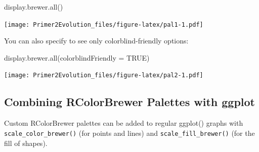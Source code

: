 \documentclass[
]{book}
\newenvironment{Shaded}{\begin{snugshade}}{\end{snugshade}}
\newcommand{\AttributeTok}[1]{\textcolor[rgb]{0.77,0.63,0.00}{#1}}
\newcommand{\ConstantTok}[1]{\textcolor[rgb]{0.00,0.00,0.00}{#1}}
\newcommand{\FunctionTok}[1]{\textcolor[rgb]{0.00,0.00,0.00}{#1}}
\newcommand{\NormalTok}[1]{#1}
\begin{document}
\begin{Shaded}
\begin{Highlighting}[]
\FunctionTok{display.brewer.all}\NormalTok{()}
\end{Highlighting}
\end{Shaded}

\texttt{[image: Primer2Evolution\_files/figure-latex/pal1-1.pdf]}

You can also specify to see only colorblind-friendly options:

\begin{Shaded}
\begin{Highlighting}[]
\FunctionTok{display.brewer.all}\NormalTok{(}\AttributeTok{colorblindFriendly =} \ConstantTok{TRUE}\NormalTok{)}
\end{Highlighting}
\end{Shaded}

\texttt{[image: Primer2Evolution\_files/figure-latex/pal2-1.pdf]}

\hypertarget{combining-rcolorbrewer-palettes-with-ggplot}{%
\subsection{Combining RColorBrewer Palettes with ggplot}\label{combining-rcolorbrewer-palettes-with-ggplot}}

Custom RColorBrewer palettes can be added to regular ggplot() graphs with \texttt{scale\_color\_brewer()} (for points and lines) and \texttt{scale\_fill\_brewer()} (for the fill of shapes).
\end{document}
